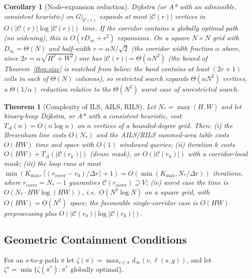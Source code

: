 \documentclass[preprint,12pt,authoryear]{elsarticle}
\newtheorem{corollary}{Corollary}
\newtheorem{theorem}{Theorem}
\begin{document}
\begin{corollary}[Node-expansion reduction]\label{cor:reduction}
Dijkstra (or A* with an admissible, consistent heuristic) on $G|_{\mathcal{C}(r)}$ expands at most $|\mathcal{C}(r)|$ vertices in $O(|\mathcal{C}(r)| \log |\mathcal{C}(r)|)$ time. If the corridor contains a globally optimal path (no widening), this is $O(r D_\infty + r^2)$ expansions. On a square $N \times N$ grid with $D_\infty = \Theta(N)$ and half-width $r = \alpha N/\sqrt{2}$ (the corridor width fraction $\alpha$ above, since $2r = \alpha\sqrt{H^2+W^2}$) one has $|\mathcal{C}(r)| = \Theta(\alpha N^2)$ (the bound of Theorem~\ref{thm:size} is matched from below: the band contains at least $(2r+1)$ cells in each of $\Theta(N)$ columns), so restricted search expands $\Theta(\alpha N^2)$ vertices, a $\Theta(1/\alpha)$ reduction relative to the $\Theta(N^2)$ worst case of unrestricted search.
\end{corollary}

\begin{theorem}[Complexity of ILS, AILS, RILS]\label{thm:complexity}
Let $N_{\!*} = \max(H,W)$ and let binary-heap Dijkstra, or A* with a consistent heuristic, cost $T_{\mathcal{A}}(n) = O(n \log n)$ on $n$ vertices of a bounded-degree grid. Then: \textup{(i)} the Bresenham line costs $O(N_{\!*})$ and the AILS/RILS summed-area table costs $O(HW)$ time and space with $O(1)$ windowed queries; \textup{(ii)} iteration $k$ costs $O(HW) + T_{\mathcal{A}}(|\mathcal{C}(r_k)|)$ (dense mask), or $O(|\mathcal{C}(r_k)|)$ with a corridor-local mask; \textup{(iii)} the loop runs at most $\min(K_{\max}, \lceil (r_{\mathrm{cover}}-r_0)/\Delta r \rceil + 1) = O(\min(K_{\max}, N_{\!*}/\Delta r))$ iterations, where $r_{\mathrm{cover}} = N_{\!*} - 1$ guarantees $\mathcal{C}(r_{\mathrm{cover}}) \supseteq V$; \textup{(iv)} worst case the time is $O(N_{\!*} \cdot HW \log(HW))$, i.e.\ $O(N^3 \log N)$ on a square grid, with $O(HW) = O(N^2)$ space; the favourable single-corridor case is $O(HW)$ preprocessing plus $O(|\mathcal{C}(r_0)| \log |\mathcal{C}(r_0)|)$.
\end{theorem}

\subsection{Geometric Containment Conditions}\label{subsec:containment}

For an $s$-to-$g$ path $\pi$ let $\zeta(\pi) = \max_{v \in \pi} d_\infty(v, \ell(s,g))$, and let $\zeta^\star = \min\{\zeta(\pi^*): \pi^* \text{ globally optimal}\}$.
\end{document}
